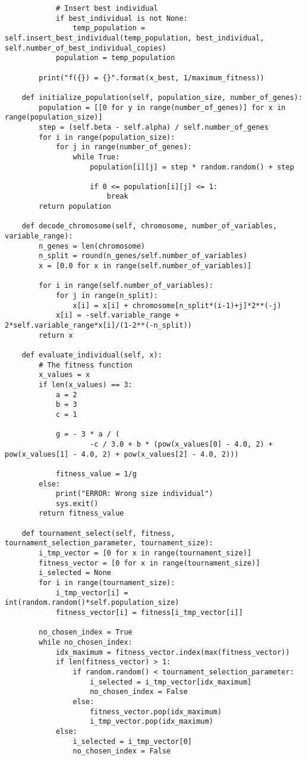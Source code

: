 \documentclass[a4paper, 12pt]{article}   	%
\begin{document}
\begin{verbatim}
			# Insert best individual
			if best_individual is not None:
				temp_population = self.insert_best_individual(temp_population, best_individual, self.number_of_best_individual_copies)
			population = temp_population

	    print("f({}) = {}".format(x_best, 1/maximum_fitness))

	def initialize_population(self, population_size, number_of_genes):
		population = [[0 for y in range(number_of_genes)] for x in range(population_size)]
		step = (self.beta - self.alpha) / self.number_of_genes
		for i in range(population_size):
			for j in range(number_of_genes):
				while True:
					population[i][j] = step * random.random() + step

					if 0 <= population[i][j] <= 1:
						break
		return population

	def decode_chromosome(self, chromosome, number_of_variables, variable_range):
		n_genes = len(chromosome)
		n_split = round(n_genes/self.number_of_variables)
		x = [0.0 for x in range(self.number_of_variables)]

		for i in range(self.number_of_variables):
			for j in range(n_split):
				x[i] = x[i] + chromosome[n_split*(i-1)+j]*2**(-j)
			x[i] = -self.variable_range + 2*self.variable_range*x[i]/(1-2**(-n_split))
		return x

	def evaluate_individual(self, x):
		# The fitness function
		x_values = x
		if len(x_values) == 3:
			a = 2
			b = 3
			c = 1

			g = - 3 * a / (
					-c / 3.0 + b * (pow(x_values[0] - 4.0, 2) + pow(x_values[1] - 4.0, 2) + pow(x_values[2] - 4.0, 2)))

			fitness_value = 1/g
		else:
			print("ERROR: Wrong size individual")
			sys.exit()
		return fitness_value

	def tournament_select(self, fitness, tournament_selection_parameter, tournament_size):
		i_tmp_vector = [0 for x in range(tournament_size)]
		fitness_vector = [0 for x in range(tournament_size)]
		i_selected = None
		for i in range(tournament_size):
			i_tmp_vector[i] = int(random.random()*self.population_size)
			fitness_vector[i] = fitness[i_tmp_vector[i]]

		no_chosen_index = True
		while no_chosen_index:
			idx_maximum = fitness_vector.index(max(fitness_vector))
			if len(fitness_vector) > 1:
				if random.random() < tournament_selection_parameter:
					i_selected = i_tmp_vector[idx_maximum]
					no_chosen_index = False
				else:
					fitness_vector.pop(idx_maximum)
					i_tmp_vector.pop(idx_maximum)
			else:
				i_selected = i_tmp_vector[0]
				no_chosen_index = False


\end{verbatim}
\end{document}
